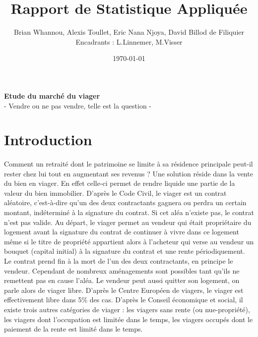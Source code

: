 \documentclass[12pt,a4paper]{article}
\title{\textbf{Rapport de Statistique Appliquée}}
\author{Brian Whannou, Alexis Toullet, Eric Nana Njoya, David Billod de Filiquier\\
Encadrants : L.Linnemer, M.Visser}
\date{\today}
\begin{document}
\begin{titlepage}

\maketitle

\vspace{5cm}

\hrulefill
\begin{center}
 \begin{huge}
\textbf{Etude du marché du viager}\\
\vspace{1cm}
 - Vendre ou ne pas vendre, telle est la question - 
 \end{huge}
 \end{center} 

\hrulefill


\end{titlepage}


\section*{Introduction}

\paragraph{}
Comment un retraité dont le patrimoine se limite à sa résidence principale peut-il rester chez lui tout en augmentant ses revenus ? Une solution réside dans la vente du bien en viager. En effet celle-ci permet de rendre liquide une partie de la valeur du bien immobilier. D’après le Code Civil, le viager est un contrat aléatoire, c’est-à-dire qu’un des deux contractants gagnera ou perdra un certain montant, indéterminé à la signature du contrat. Si cet aléa n’existe pas, le contrat n’est pas valide.
Au départ, le viager permet au vendeur qui était propriétaire du logement avant la signature du contrat de continuer à vivre dans ce logement même si le titre de propriété appartient alors à l’acheteur qui verse au vendeur un bouquet (capital initial) à la signature du contrat et une rente périodiquement. Le contrat prend fin à la mort de l’un des deux contractants, en principe le vendeur. Cependant de nombreux aménagements sont possibles tant qu’ils ne remettent pas en cause l’aléa. Le vendeur peut aussi quitter son logement, on parle alors de viager libre. D’après le Centre Européen de viagers, le viager est effectivement libre dans 5\% des cas. D’après le Conseil économique et social, il existe trois autres catégories de viager : les viagers sans rente (ou nue-propriété), les viagers dont l’occupation est limitée dans le temps, les viagers occupés dont le paiement de la rente est limité dans le temps.
\end{document}
